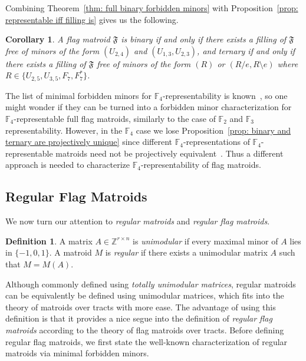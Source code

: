 \documentclass[12pt]{article}
\newtheorem{cor}[thm]{Corollary}
\theoremstyle{definition}
\newtheorem{defn}[thm]{Definition}
\begin{document}
Combining Theorem~\ref{thm: full binary forbidden minors} with Proposition~\ref{prop: representable iff filling is}
gives us the following.

\begin{cor}\label{cor: binary iff all fillings are binary}
    A flag matroid $\mathfrak{F}$ is binary if and only if there exists a filling of $\mathfrak{F}$ free of minors of the form $(U_{2,4})$ and $(U_{1,3},U_{2,3})$,
    and ternary if and only if there exists a filling of $\mathfrak{F}$ free of minors of the form $(R)$ or $(R/e, R\setminus e)$ where $R \in \{U_{2,5}, U_{3,5}, F_7, F^*_7\}$.
\end{cor}

The list of minimal forbidden minors for $\mathbb{F}_4$-representability is known~\cite{geelen2000excluded},
so one might wonder if they can be turned into a forbidden minor characterization for $\mathbb{F}_4$-representable
full flag matroids, similarly to the case of $\mathbb{F}_2$ and $\mathbb{F}_3$ representability.
However, in the $\mathbb{F}_4$ case we lose Proposition~\ref{prop: binary and ternary are projectively unique} since different $\mathbb{F}_4$-representations of $\mathbb{F}_4$-representable
matroids need not be projectively equivalent~\cite[Proposition~14.6.3]{oxley}.
Thus a different approach is needed to characterize $\mathbb{F}_4$-representability of flag matroids. 


\subsection{Regular Flag Matroids}
We now turn our attention to \emph{regular matroids} and \emph{regular flag matroids}.

\begin{defn}
    A matrix $A\in \mathbb{Z}^{r\times n}$ is \emph{unimodular} if every maximal minor of $A$ lies in $\{-1, 0, 1\}$. A matroid $M$ is \emph{regular} if there exists a unimodular matrix $A$ such that $M=M(A)$.
\end{defn}

Although commonly defined using \emph{totally unimodular matrices}, regular matroids can be equivalently be defined using unimodular matrices, which fits into the theory of matroids over tracts with more ease. The advantage of using this definition is that it provides a nice segue into the definition of \emph{regular flag matroids} according to the theory of flag matroids over tracts\cite{jarra2024flag}. Before defining regular flag matroids, we first state the well-known characterization of regular matroids via minimal forbidden minors. 
\end{document}
